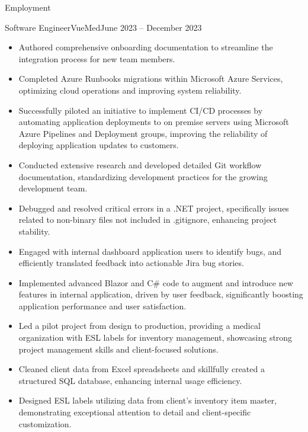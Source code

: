\documentclass[]{mcdowellcv}
\begin{document}
	\makeheader
	
	\begin{cvsection}{Employment}
		\begin{cvsubsection}{Software Engineer}{VueMed}{June 2023 -- December 2023}			
			\begin{itemize}
				\item Authored comprehensive onboarding documentation to streamline the integration process for new team members.
				\item Completed Azure Runbooks migrations within Microsoft Azure Services, optimizing cloud operations and improving system reliability.
				\item Successfully piloted an initiative to implement CI/CD processes by automating application deployments to on premise servers using Microsoft Azure Pipelines and Deployment groups, improving the reliability of deploying application updates to customers. 
				\item Conducted extensive research and developed detailed Git workflow documentation, standardizing development practices for the growing development team.
				\item Debugged and resolved critical errors in a .NET project, specifically issues related to non-binary files not included in .gitignore, enhancing project stability.
				\item Engaged with internal dashboard application users to identify bugs, and efficiently translated feedback into actionable Jira bug stories.
				\item Implemented advanced Blazor and C# code to augment and introduce new features in internal application, driven by user feedback, significantly boosting application performance and user satisfaction.
				\item Led a pilot project from design to production, providing a medical organization with ESL labels for inventory management, showcasing strong project management skills and client-focused solutions.
				\item Cleaned client data from Excel spreadsheets and skillfully created a structured SQL database, enhancing internal usage efficiency. 
				\item Designed ESL labels utilizing data from client's inventory item master, demonstrating exceptional attention to detail and client-specific customization.
			\end{itemize}
		\end{cvsubsection}
		

\end{cvsection}
\end{document}
